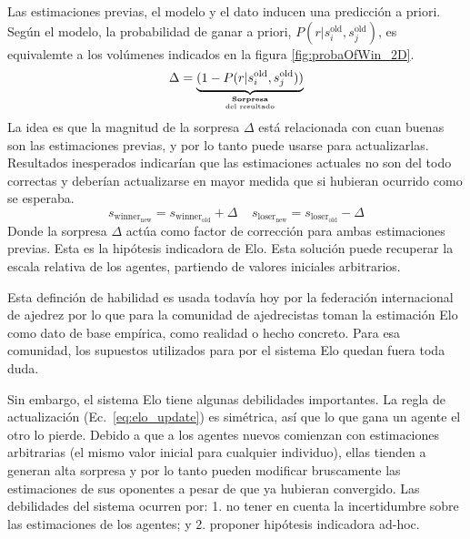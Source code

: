 \documentclass[a4paper,10pt]{book}
\newcommand\hfrac[2]{\genfrac{}{}{0pt}{}{#1}{#2}} %
\theoremstyle{definition}
\begin{document}
Las estimaciones previas, el modelo y el dato inducen una predicción a priori.
Según el modelo, la probabilidad de ganar a priori, $P(r|s_i^{\text{old}},s_j^{\text{old}})$, es equivalemte a los volúmenes indicados en la figura \ref{fig:probaOfWin_2D}.
\begin{equation*}
 \Delta = \underbrace{(1 - P(r|s_i^{\text{old}},s_j^{\text{old}}))}_{\hfrac{\textbf{Sorpresa}}{\text{del resultado}}}
\end{equation*}
La idea es que la magnitud de la sorpresa $\Delta$ est\'a relacionada con cuan buenas son las estimaciones previas, y por lo tanto puede usarse para actualizarlas.
Resultados inesperados indicar\'ian que las estimaciones actuales no son del todo correctas y deber\'ian actualizarse en mayor medida que si hubieran ocurrido como se esperaba.
\begin{equation}\label{eq:elo_update}
 s_{\text{winner}_\text{new}} = s_{\text{winner}_\text{old}} + \Delta \ \ \ \ \ s_{\text{loser}_\text{new}} = s_{\text{loser}_\text{old}} - \Delta 
\end{equation}
Donde la sorpresa $\Delta$ act\'ua como factor de correcci\'on para ambas estimaciones previas.
Esta es la hipótesis indicadora de Elo.
Esta soluci\'on puede recuperar la escala relativa de los agentes, partiendo de valores iniciales arbitrarios.

\begin{center}
\end{center}

Esta definción de habilidad es usada todavía hoy por la federación internacional de ajedrez por lo que para la comunidad de ajedrecistas toman la estimación Elo como dato de base empírica, como realidad o hecho concreto.
Para esa comunidad, los supuestos utilizados para por el sistema Elo quedan fuera toda duda.


Sin embargo, el sistema Elo tiene algunas debilidades importantes. 
La regla de actualizaci\'on (Ec.~\eqref{eq:elo_update}) es sim\'etrica, as\'i que lo que gana un agente el otro lo pierde.
Debido a que a los agentes nuevos comienzan con estimaciones arbitrarias (el mismo valor inicial para cualquier individuo), ellas tienden a generan alta sorpresa y por lo tanto pueden modificar bruscamente las estimaciones de sus oponentes a pesar de que ya hubieran convergido.
Las debilidades del sistema ocurren por: 1. no tener en cuenta la incertidumbre sobre las estimaciones de los agentes; y 2. proponer hipótesis indicadora ad-hoc.
\end{document}
